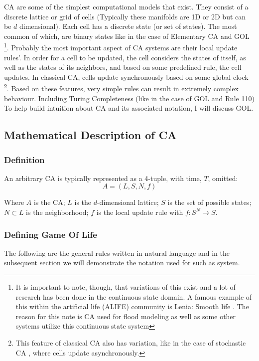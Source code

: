 CA are some of the simplest computational models that exist. They consist of a discrete lattice or grid of cells (Typically these manifolds are 1D or 2D but can be $d$ dimensional). Each cell has a discrete state (or set of states). The most common of which, are binary states like in the case of Elementary CA and GOL \footnote{It is important to note, though, that variations of this exist and a lot of research has been done in the continuous state domain. A famous example of this within the artificial life (ALIFE) community is Lenia: Smooth life \cite{chan2018lenia}. The reason for this note is CA used for flood modeling as well as some other systems utilize this continuous state system}. Probably the most important aspect of CA systems are their local update rules'. In order for a cell to be updated, the cell considers the states of itself, as well as the states of its neighbors, and based on some predefined rule, the cell updates. In classical CA, cells update synchronously based on some global clock \footnote{This feature of classical CA also has variation, like in the case of stochastic CA \cite{fates2013stochastic}, where cells update asynchronously.}. Based on these features, very simple rules can result in extremely complex behaviour. Including Turing Completeness (like in the case of GOL and Rule 110) \\

To help build intuition about CA and its associated notation, I will discuss GOL.

\subsection{Mathematical Description of CA}
\subsubsection*{Definition}

An arbitrary CA is typically represented as a 4-tuple, with time, $T$, omitted:
\begin{equation} \label{eq:2.1}
	A = (L, S, N, f)
\end{equation}

Where $A$ is the CA; $L$ is the $d$-dimensional lattice; $S$ is the set of possible states; $N \subset L$ is the neighborhood; $f$ is the local update rule with $f: S^{N}\rightarrow S$. 
\subsubsection*{Defining Game Of Life}
The following are the general rules written in natural language and in the subsequent section we will demonstrate the notation used for such as system.

